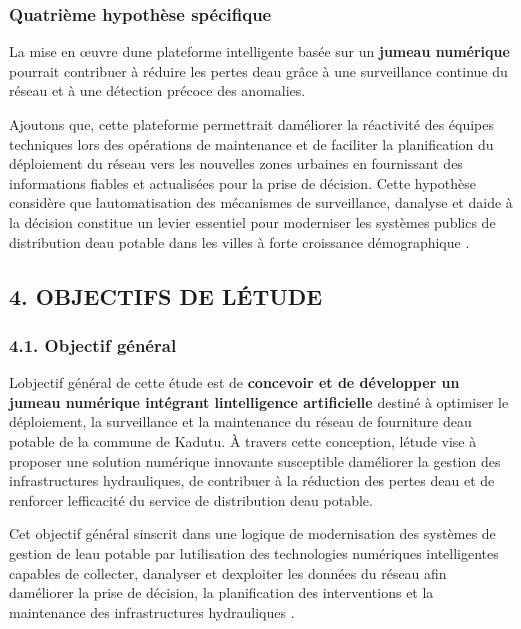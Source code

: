 \documentclass[12pt,a4paper,oneside]{report}
\begin{document}
\subsubsection{Quatrième hypothèse
spécifique}\label{quatriuxe8me-hypothuxe8se-spuxe9cifique}

La mise en œuvre d\textquotesingle une plateforme intelligente basée sur
un \textbf{jumeau numérique} pourrait contribuer à réduire les pertes
d\textquotesingle eau grâce à une surveillance continue du réseau et à
une détection précoce des anomalies.

Ajoutons que, cette plateforme permettrait d\textquotesingle améliorer
la réactivité des équipes techniques lors des opérations de maintenance
et de faciliter la planification du déploiement du réseau vers les
nouvelles zones urbaines en fournissant des informations fiables et
actualisées pour la prise de décision. Cette hypothèse considère que
l\textquotesingle automatisation des mécanismes de surveillance,
d\textquotesingle analyse et d\textquotesingle aide à la décision
constitue un levier essentiel pour moderniser les systèmes publics de
distribution d\textquotesingle eau potable dans les villes à forte
croissance démographique \cite{ref17}.

\subsection{4. OBJECTIFS DE
L\textquotesingle ÉTUDE}\label{objectifs-de-luxe9tude}

\subsubsection{4.1. Objectif général}\label{objectif-guxe9nuxe9ral}

L\textquotesingle objectif général de cette étude est de
\textbf{concevoir et de développer un jumeau numérique intégrant
l\textquotesingle intelligence artificielle} destiné à optimiser le
déploiement, la surveillance et la maintenance du réseau de fourniture
d\textquotesingle eau potable de la commune de Kadutu. À travers cette
conception, l\textquotesingle étude vise à proposer une solution
numérique innovante susceptible d\textquotesingle améliorer la gestion
des infrastructures hydrauliques, de contribuer à la réduction des
pertes d\textquotesingle eau et de renforcer
l\textquotesingle efficacité du service de distribution
d\textquotesingle eau potable.

Cet objectif général s\textquotesingle inscrit dans une logique de
modernisation des systèmes de gestion de l\textquotesingle eau potable
par l\textquotesingle utilisation des technologies numériques
intelligentes capables de collecter, d\textquotesingle analyser et
d\textquotesingle exploiter les données du réseau afin
d\textquotesingle améliorer la prise de décision, la planification des
interventions et la maintenance des infrastructures hydrauliques
\cite{ref17}.
\end{document}
